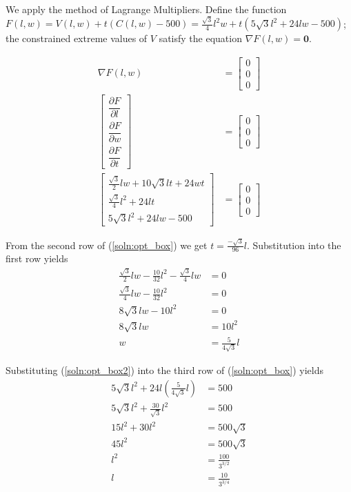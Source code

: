 We apply the method of Lagrange Multipliers.  Define the function
$F(l,w) = V(l,w) + t(C(l,w) - 500) =
\frac{\sqrt{3}}{4}l^2w + t(5\sqrt{3}l^2 + 24lw - 500)$;
the constrained extreme values of $V$ satisfy the equation
$\nabla F(l,w) = \mathbf{0}$.

\begin{align}
 \nabla F(l,w) &= \begin{bmatrix} 0 \\ 0 \\ 0 \end{bmatrix} \nonumber \\
 \begin{bmatrix}
  \dfrac{\partial F}{\partial l} \\
  \dfrac{\partial F}{\partial w} \\
  \dfrac{\partial F}{\partial t}
 \end{bmatrix} &= \begin{bmatrix} 0 \\ 0 \\ 0 \end{bmatrix} \nonumber \\
 \begin{bmatrix}
  \frac{\sqrt{3}}{2}lw + 10\sqrt{3}lt + 24wt \\
  \frac{\sqrt{3}}{4}l^2 + 24lt \\
  5\sqrt{3}l^2 + 24lw - 500
 \end{bmatrix} &= \begin{bmatrix} 0 \\ 0 \\ 0 \end{bmatrix} \label{soln:opt_box}
\end{align}

From the second row of (\ref{soln:opt_box}) we get $t = \frac{-\sqrt{3}}{96}l$.
Substitution into the first row yields
\begin{align}
 \frac{\sqrt{3}}{2}lw - \frac{10}{32}l^2 - \frac{\sqrt{3}}{4}lw &= 0 \nonumber \\
 \frac{\sqrt{3}}{4}lw - \frac{10}{32}l^2 &= 0 \nonumber \\
 8\sqrt{3}lw - 10l^2 &= 0 \nonumber \\
 8\sqrt{3}lw &= 10l^2 \nonumber \\
 w &= \frac{5}{4\sqrt{3}}l \label{soln:opt_box2}
\end{align}

Substituting (\ref{soln:opt_box2}) into the third row of (\ref{soln:opt_box})
yields
\begin{align*}
 5\sqrt{3}l^2 + 24l(\frac{5}{4\sqrt{3}}l) &= 500 \\
 5\sqrt{3}l^2 + \frac{30}{\sqrt{3}}l^2 &= 500 \\
 15l^2 + 30l^2 &= 500\sqrt{3} \\
 45l^2 &= 500\sqrt{3} \\
 l^2 &= \frac{100}{3^{3/2}} \\
 l &= \frac{10}{3^{3/4}}
\end{align*}

